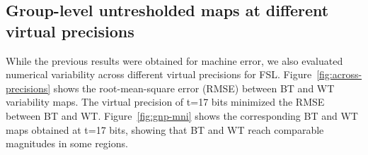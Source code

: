 \documentclass[conference]{IEEEtran}
\begin{document}
\begin{figure}[ht]
\end{figure}




\subsection{Group-level untresholded maps at different virtual precisions}

While the previous results were obtained for machine error, we also evaluated numerical variability across different virtual precisions for FSL.
Figure~\ref{fig:across-precisions} shows the root-mean-square error (RMSE) between BT and WT variability maps.
The virtual precision of t=17 bits minimized the RMSE between BT and WT.
Figure~\ref{fig:gnp-mni} shows the corresponding BT and WT maps obtained at t=17 bits, showing 
that BT and WT reach comparable magnitudes in some regions.
\end{document}
